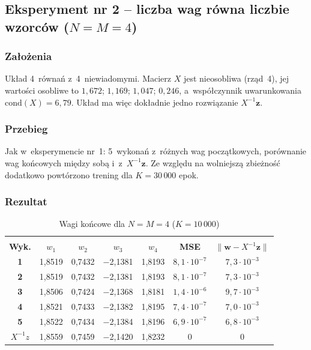 \documentclass[12pt]{article}
\begin{document}
\newpage
\subsection{Eksperyment nr 2 -- liczba wag równa liczbie wzorców ($N=M=4$)}

\subsubsection{Założenia}

Układ 4~równań z~4~niewiadomymi. Macierz $X$ jest nieosobliwa (rząd~4),
jej wartości osobliwe to $1{,}672$; $1{,}169$; $1{,}047$; $0{,}246$,
a~współczynnik uwarunkowania $\mathrm{cond}(X)=6{,}79$. Układ ma więc dokładnie
jedno rozwiązanie $X^{-1}\mathbf{z}$.

\subsubsection{Przebieg}

Jak w~eksperymencie nr~1: 5~wykonań z~różnych wag początkowych, porównanie wag
końcowych między sobą i~z~$X^{-1}\mathbf{z}$. Ze względu na wolniejszą zbieżność
dodatkowo powtórzono trening dla $K = 30\,000$ epok.

\subsubsection{Rezultat}

\begin{table}[h!]
 \caption{Wagi końcowe dla $N=M=4$ ($K=10\,000$)}
 \centering
 \vspace{0.2cm}
 \begin{tabular}{c c c c c c c}
  \hline\hline\\[-0.4cm]
  \textbf{Wyk.} & $w_1$ & $w_2$ & $w_3$ & $w_4$ & \textbf{MSE} & $\|\mathbf{w}-X^{-1}\mathbf{z}\|$\\[0.1cm]
  \hline
  \textbf{1} & 1,8519 & 0,7432 & $-$2,1381 & 1,8193 & $8{,}1\cdot 10^{-7}$ & $7{,}3\cdot 10^{-3}$ \\
  \textbf{2} & 1,8519 & 0,7432 & $-$2,1381 & 1,8193 & $8{,}1\cdot 10^{-7}$ & $7{,}3\cdot 10^{-3}$ \\
  \textbf{3} & 1,8506 & 0,7424 & $-$2,1368 & 1,8181 & $1{,}4\cdot 10^{-6}$ & $9{,}7\cdot 10^{-3}$ \\
  \textbf{4} & 1,8521 & 0,7433 & $-$2,1382 & 1,8195 & $7{,}4\cdot 10^{-7}$ & $7{,}0\cdot 10^{-3}$ \\
  \textbf{5} & 1,8522 & 0,7434 & $-$2,1384 & 1,8196 & $6{,}9\cdot 10^{-7}$ & $6{,}8\cdot 10^{-3}$ \\
  \hline
  $X^{-1}z$ & 1,8559 & 0,7459 & $-$2,1420 & 1,8232 & 0 & 0 \\[0.1cm]
  \hline
 \end{tabular}
 \label{tab_n4m4}
\end{table}
\end{document}
